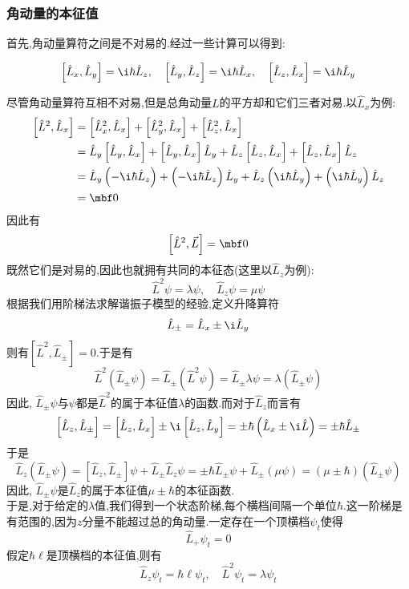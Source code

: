 \documentclass{ctexart}
\begin{document}
\subsubsection{角动量的本征值}
首先,角动量算符之间是不对易的.经过一些计算可以得到:
\begin{theorem}[角动量对易关系]
    \[\left[\hat{L}_x,\hat{L}_y\right]=\i\hbar\hat{L}_z,\quad\left[\hat{L}_y,\hat{L}_z\right]=\i\hbar\hat{L}_x,\quad\left[\hat{L}_z,\hat{L}_x\right]=\i\hbar\hat{L}_y\]
\end{theorem}
尽管角动量算符互相不对易,但是总角动量$L$的平方却和它们三者对易.以$\hat{L}_x$为例:
\[\begin{aligned}
    \left[\hat{L}^2,\hat{L}_x\right]
    &=\left[\hat{L}_x^2,\hat{L}_x\right]+\left[\hat{L}_y^2,\hat{L}_x\right]+\left[\hat{L}_z^2,\hat{L}_x\right]\\
    &=\hat{L}_y\left[\hat{L}_y,\hat{L}_x\right]+\left[\hat{L}_y,\hat{L}_x\right]\hat{L}_y+\hat{L}_z\left[\hat{L}_z,\hat{L}_x\right]+\left[\hat{L}_z,\hat{L}_x\right]\hat{L}_z\\
    &=\hat{L}_y\left(-\i\hbar\hat{L}_z\right)+\left(-\i\hbar\hat{L}_z\right)\hat{L}_y+\hat{L}_z\left(\i\hbar\hat{L}_y\right)+\left(\i\hbar\hat{L}_y\right)\hat{L}_z\\
    &=\mbf0
\end{aligned}\]
因此有
\[\left[\hat{L}^2,\vec{L}\right]=\mbf0\]
\indent 既然它们是对易的,因此也就拥有共同的本征态(这里以$\hat{L}_z$为例):
\[\hat{L}^2\psi=\lambda\psi,\quad\hat{L}_z\psi=\mu\psi\]
根据我们用阶梯法求解谐振子模型的经验,定义升降算符
\[\hat{L}_{\pm}=\hat{L}_x\pm\i\hat{L}_y\]
则有$\left[\hat{L}^2,\hat{L}_{\pm}\right]=0$.于是有
\[\hat{L}^2(\hat{L}_\pm\psi)=\hat{L}_\pm(\hat{L}^2\psi)=\hat{L}_\pm\lambda\psi=\lambda(\hat{L}_\pm\psi)\]
因此, $\hat{L}_\pm\psi$与$\psi$都是$\hat{L}^2$的属于本征值$\lambda$的函数.而对于$\hat{L}_z$而言有
\[\left[\hat{L}_z,\hat{L}_{\pm}\right]=\left[\hat{L}_z,\hat{L}_x\right]\pm\i\left[\hat{L}_z,\hat{L}_y\right]=\pm\hbar\left(\hat{L}_x\pm\i\hat{L}\right)=\pm\hbar\hat{L}_{\pm}\]
于是
\[\hat{L}_z\left(\hat{L}_{\pm}\psi\right)=\left[\hat{L}_z,\hat{L}_\pm\right]\psi+\hat{L}_\pm\hat{L}_z\psi=\pm\hbar\hat{L}_\pm\psi+\hat{L}_\pm(\mu\psi)=(\mu\pm\hbar)\left(\hat{L}_\pm\psi\right)\]
因此, $\hat{L}_\pm\psi$是$\hat{L}_z$的属于本征值$\mu\pm\hbar$的本征函数.\\
\indent 于是,对于给定的$\lambda$值,我们得到一个状态阶梯,每个横档间隔一个单位$\hbar$.这一阶梯是有范围的,因为$z$分量不能超过总的角动量.一定存在一个顶横档$\psi_t$使得
\[\hat{L}_+\psi_t=0\]
假定$\hbar\ell$是顶横档的本征值,则有
\[\hat{L}_z\psi_t=\hbar\ell\psi_t,\quad\hat{L}^2\psi_t=\lambda\psi_t\]
\end{document}
